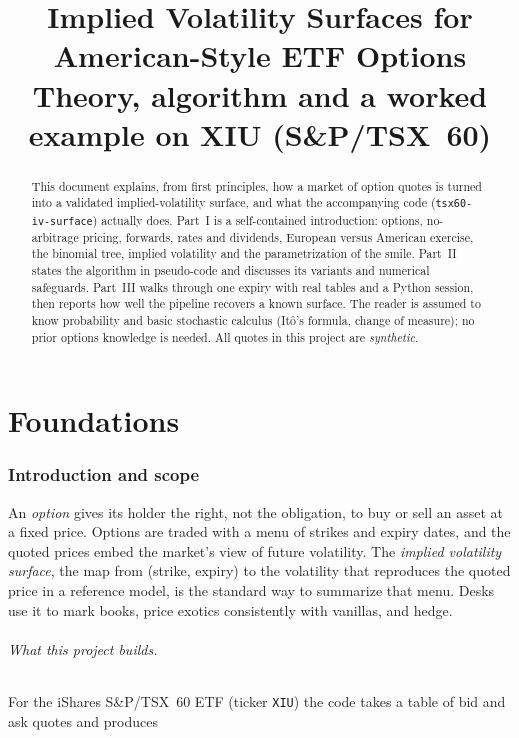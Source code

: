 \documentclass[11pt]{article}
\title{Implied Volatility Surfaces for American-Style ETF Options\\[2pt]
\large Theory, algorithm and a worked example on XIU (S\&P/TSX~60)}
\author{}
\date{}
\begin{document}
\maketitle

\begin{abstract}
\noindent This document explains, from first principles, how a market of option
quotes is turned into a validated implied-volatility surface, and what the
accompanying code (\texttt{tsx60-iv-surface}) actually does. Part~I is a
self-contained introduction: options, no-arbitrage pricing, forwards, rates and
dividends, European versus American exercise, the binomial tree, implied
volatility and the parametrization of the smile. Part~II states the algorithm in
pseudo-code and discusses its variants and numerical safeguards. Part~III walks
through one expiry with real tables and a Python session, then reports how well
the pipeline recovers a known surface. The reader is assumed to know
probability and basic stochastic calculus (It\^o's formula, change of measure);
no prior options knowledge is needed. All quotes in this project are
\emph{synthetic}.
\end{abstract}

\tableofcontents
\newpage

\part{Foundations}

\section{Introduction and scope}\label{sec:intro}

An \emph{option} gives its holder the right, not the obligation, to buy or sell
an asset at a fixed price. Options are traded with a menu of strikes and expiry
dates, and the quoted prices embed the market's view of future volatility. The
\emph{implied volatility surface}, the map from (strike, expiry) to the
volatility that reproduces the quoted price in a reference model, is the
standard way to summarize that menu. Desks use it to mark books, price exotics
consistently with vanillas, and hedge.

\paragraph{What this project builds.} For the iShares S\&P/TSX~60 ETF (ticker
\texttt{XIU}) the code takes a table of bid and ask quotes and produces
\end{document}
